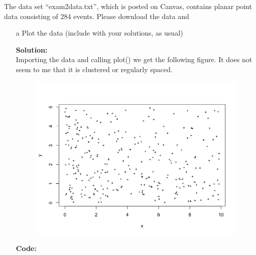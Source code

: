 \documentclass[12pt]{article}
\makeatletter
\theoremstyle{homework}
\newenvironment{exercise}[1]
{\def\@currentlabel{#1}\exercisecore}
{\endexercisecore}
\newcommand{\localhead}[1]{\par\smallskip\noindent\textbf{#1}\nobreak\\}%
\newcommand\solution{\localhead{Solution:}}
\makeatother
\begin{document}
\begin{exercise}{7} The data set “exam2data.txt”, which is posted on Canvas, 
  contains planar point data consisting of 284 events. Please download the data and\:
  \begin{enumerate}
    \item[a]Plot the data (include with your solutions, as usual)\\
    \solution Importing the data and calling plot() we get the following figure. It does not seem to me that it is clustered or regularly spaced. 
    \begin{figure}[H]
      \begin{center}
      \includegraphics[width = .9\textwidth]{Rplot.png}
      \end{center}
    \end{figure} 
    \textbf{Code:}
    \begin{center}
    
    \end{center}
    \vspace{.15in}
    

\end{enumerate}
\end{exercise}
\end{document}
